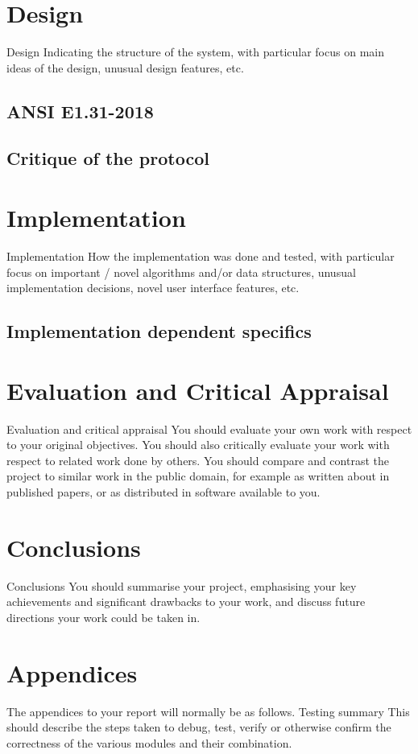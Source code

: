 \documentclass[11pt,a4paper]{report}
\begin{document}
	\section{Design}
	Design
	Indicating the structure of the system, with particular
	focus on main ideas of the design, unusual design
	features, etc.
	\subsection{ANSI E1.31-2018}
	\subsection{Critique of the protocol}
	\section{Implementation}
	Implementation
	How the implementation was done and tested, with
	particular focus on important / novel algorithms
	and/or data structures, unusual implementation
	decisions, novel user interface features, etc.
	
	\subsection{Implementation dependent specifics}
	
	\section{Evaluation and Critical Appraisal}
	Evaluation and
	critical
	appraisal
	You should evaluate your own work with respect to
	your original objectives. You should also critically
	evaluate your work with respect to related work done
	by others. You should compare and contrast the project
	to similar work in the public domain, for example as
	written about in published papers, or as distributed in
	software available to you.
	
	\section{Conclusions}
	Conclusions
	You should summarise your project, emphasising your
	key achievements and significant drawbacks to your
	work, and discuss future directions your work could be
	taken in.
	
	\section{Appendices}
	The appendices to your report will normally be as follows.
	Testing
	summary
	This should describe the steps taken to debug, test,
	verify or otherwise confirm the correctness of the
	various modules and their combination.
	
\end{document}
